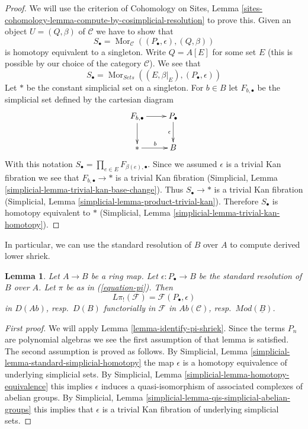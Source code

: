\documentclass[10pt,a4paper]{amsart}
\theoremstyle{plain}
\newtheorem{lemma}[subsection]{Lemma}
\theoremstyle{definition}
\theoremstyle{remark}
\numberwithin{equation}{subsection}
\def\Mor{\mathop{\mathrm{Mor}}\nolimits}
\begin{document}
\begin{proof}
We will use the criterion of Cohomology on Sites, Lemma
\ref{sites-cohomology-lemma-compute-by-cosimplicial-resolution} to prove this.
Given an object $U = (Q, \beta)$ of $\mathcal{C}$ we have to show that
$$
S_\bullet = \Mor_\mathcal{C}((P_\bullet, \epsilon), (Q, \beta))
$$
is homotopy equivalent to a singleton.
Write $Q = A[E]$ for some set $E$ (this is possible by our choice of
the category $\mathcal{C}$). We see that
$$
S_\bullet = \Mor_{\textit{Sets}}((E, \beta|_E), (P_\bullet, \epsilon))
$$
Let $*$ be the constant simplicial set on a singleton. For $b \in B$
let $F_{b, \bullet}$ be the simplicial set defined by the cartesian
diagram
$$
\xymatrix{
F_{b, \bullet} \ar[r] \ar[d] & P_\bullet \ar[d]_\epsilon \\
{*} \ar[r]^b & B
}
$$
With this notation $S_\bullet = \prod_{e \in E} F_{\beta(e), \bullet}$.
Since we assumed $\epsilon$ is a trivial Kan fibration we see that
$F_{b, \bullet} \to *$ is a trivial Kan fibration
(Simplicial, Lemma \ref{simplicial-lemma-trivial-kan-base-change}).
Thus $S_\bullet \to *$ is a trivial Kan fibration
(Simplicial, Lemma \ref{simplicial-lemma-product-trivial-kan}).
Therefore $S_\bullet$ is homotopy equivalent to $*$
(Simplicial, Lemma \ref{simplicial-lemma-trivial-kan-homotopy}).
\end{proof}

\noindent
In particular, we can use the standard resolution of $B$ over $A$
to compute derived lower shriek.

\begin{lemma}
\label{lemma-pi-shriek-standard}
Let $A \to B$ be a ring map. Let $\epsilon : P_\bullet \to B$
be the standard resolution of $B$ over $A$. Let $\pi$ be as in
(\ref{equation-pi}). Then
$$
L\pi_!(\mathcal{F}) = \mathcal{F}(P_\bullet, \epsilon)
$$
in $D(\textit{Ab})$, resp.\ $D(B)$ functorially in $\mathcal{F}$ in
$\textit{Ab}(\mathcal{C})$, resp.\ $\textit{Mod}(\underline{B})$.
\end{lemma}

\begin{proof}[First proof]
We will apply Lemma \ref{lemma-identify-pi-shriek}.
Since the terms $P_n$ are polynomial algebras we see the first
assumption of that lemma is satisfied. The second assumption is proved
as follows. By
Simplicial, Lemma \ref{simplicial-lemma-standard-simplicial-homotopy}
the map $\epsilon$ is a homotopy equivalence of underlying
simplicial sets. By
Simplicial, Lemma \ref{simplicial-lemma-homotopy-equivalence}
this implies $\epsilon$ induces a quasi-isomorphism of associated
complexes of abelian groups. By
Simplicial, Lemma \ref{simplicial-lemma-qis-simplicial-abelian-groups}
this implies that $\epsilon$ is a trivial Kan fibration of underlying
simplicial sets.
\end{proof}
\end{document}
